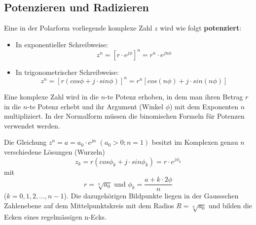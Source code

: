 \subsection{Potenzieren und Radizieren}
\begin{definition}
Eine in der Polarform vorliegende komplexe Zahl $z$ wird wie folgt \textbf{potenziert}:
\begin{itemize}
	\item In exponentieller Schreibweise:
	$$ z^n = [r \cdot e^{j\phi}]^n = r^n \cdot e^{jn\phi}$$
	\item In trigonometrischer Schreibweise:
	$$z^n = [r(cos\phi + j \cdot sin \phi)]^n = r^n [cos(n\phi) + j \cdot sin(n\phi)]$$
\end{itemize}
Eine komplexe Zahl wird in die $n$-te Potenz erhoben, in dem man ihren Betrag $r$ in die $n$-te Potenz erhebt und ihr Argument (Winkel $\phi$) mit dem Exponenten $n$ multipliziert. In der Normalform müssen die binomischen Formeln für Potenzen verwendet werden.
\end{definition}

\begin{definition}
Die Gleichung $z^n = a = a_0 \cdot e^{ja}$ $(a_0 > 0; n=1)$ besitzt im Komplexen genau $n$ verschiedene Lösungen (Wurzeln)
$$ z_k = r(cos\phi_k + j \cdot sin\phi_k) = r \cdot e^{j\phi_k}$$
mit
$$ r = \sqrt[n]{a_0} \text{ und } \phi_k = \frac{a + k \cdot 2\phi}{n}$$
($k = 0,1,2,...,n-1$). Die dazugehörigen Bildpunkte liegen in der Gaussschen Zahlenebene auf dem Mittelpunktskreis mit dem Radios $R=\sqrt[n]{a_0}$ und bilden die Ecken eines regelmässigen n-Ecks.
\end{definition}